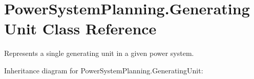 \hypertarget{class_power_system_planning_1_1_generating_unit}{}\section{Power\+System\+Planning.\+Generating\+Unit Class Reference}
\label{class_power_system_planning_1_1_generating_unit}


Represents a single generating unit in a given power system.  




Inheritance diagram for Power\+System\+Planning.\+Generating\+Unit\+:
